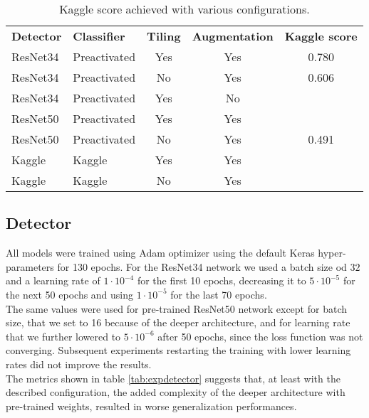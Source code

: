 \begin{table*}[h]
	\begin{tabular}{llccc}
		\rowcolor[HTML]{EFEFEF} 
		\textbf{Detector} & \textbf{Classifier} & \textbf{Tiling} & \textbf{Augmentation} & \textbf{Kaggle score} \\
		ResNet34          & Preactivated        & Yes             & Yes                   & 0.780                 \\
		ResNet34          & Preactivated        & No              & Yes                   & 0.606                 \\
		ResNet34          & Preactivated        & Yes             & No                    &                       \\
		ResNet50          & Preactivated        & Yes             & Yes                   &                       \\
		ResNet50          & Preactivated        & No              & Yes                   & 0.491                 \\
		Kaggle            & Kaggle              & Yes             & Yes                   &                       \\
		Kaggle            & Kaggle              & No              & Yes                   &                      
	\end{tabular}
	\caption{Kaggle score achieved with various configurations.}
	\label{tab:finaltests}
\end{table*}

\subsection{Detector}
\label{ssec:detectorexp}

All models were trained using Adam optimizer using the default Keras hyper-parameters for 130 epochs. For the ResNet34 network we used a batch size od $32$ and a learning rate of $1 \cdot 10^{-4}$ for the first 10 epochs, decreasing it to $5 \cdot 10^{-5}$ for the next 50 epochs and using $1 \cdot 10^{-5}$ for the last 70 epochs. \\
The same values were used for pre-trained ResNet50 network except for batch size, that we set to 16 because of the deeper architecture, and for learning rate that we further lowered to $5 \cdot 10^{-6}$ after 50 epochs, since the loss function was not converging. Subsequent experiments restarting the training with lower learning rates did not improve the results.\\
The metrics shown in table \ref{tab:expdetector} suggests that, at least with the described configuration, the added complexity of the deeper architecture with pre-trained weights, resulted in worse generalization performances.

